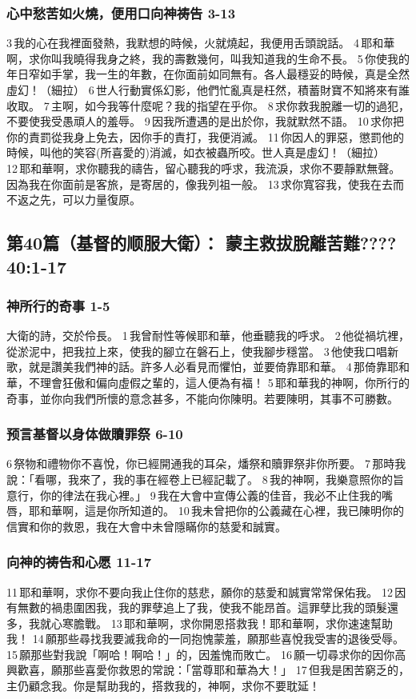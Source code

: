 \subsubsection{心中愁苦如火燒，便用口向神祷告 3-13}
3 我的心在我裡面發熱，我默想的時候，火就燒起，我便用舌頭說話。
4 耶和華啊，求你叫我曉得我身之終，我的壽數幾何，叫我知道我的生命不長。
5 你使我的年日窄如手掌，我一生的年數，在你面前如同無有。各人最穩妥的時候，真是全然虛幻！（細拉）
6 世人行動實係幻影，他們忙亂真是枉然，積蓄財寶不知將來有誰收取。
7 主啊，如今我等什麼呢？我的指望在乎你。
8 求你救我脫離一切的過犯，不要使我受愚頑人的羞辱。
9 因我所遭遇的是出於你，我就默然不語。
10 求你把你的責罰從我身上免去，因你手的責打，我便消滅。
11 你因人的罪惡，懲罰他的時候，叫他的笑容(所喜愛的)消滅，如衣被蟲所咬。世人真是虛幻！（細拉）
12 耶和華啊，求你聽我的禱告，留心聽我的呼求，我流淚，求你不要靜默無聲。因為我在你面前是客旅，是寄居的，像我列祖一般。
13 求你寬容我，使我在去而不返之先，可以力量復原。

\subsection{第40篇（基督的顺服大衛）： 蒙主救拔脫離苦難???? 40:1-17}
\subsubsection{神所行的奇事 1-5}
大衛的詩，交於伶長。
1 我曾耐性等候耶和華，他垂聽我的呼求。
2 他從禍坑裡，從淤泥中，把我拉上來，使我的腳立在磐石上，使我腳步穩當。
3 他使我口唱新歌，就是讚美我們神的話。許多人必看見而懼怕，並要倚靠耶和華。
4 那倚靠耶和華，不理會狂傲和偏向虛假之輩的，這人便為有福！
5 耶和華我的神啊，你所行的奇事，並你向我們所懷的意念甚多，不能向你陳明。若要陳明，其事不可勝數。
\subsubsection{预言基督以身体做贖罪祭 6-10}
6 祭物和禮物你不喜悅，你已經開通我的耳朵，燔祭和贖罪祭非你所要。
7 那時我說：「看哪，我來了，我的事在經卷上已經記載了。
8 我的神啊，我樂意照你的旨意行，你的律法在我心裡。」
9 我在大會中宣傳公義的佳音，我必不止住我的嘴唇，耶和華啊，這是你所知道的。
10 我未曾把你的公義藏在心裡，我已陳明你的信實和你的救恩，我在大會中未曾隱瞞你的慈愛和誠實。
\subsubsection{向神的祷告和心愿 11-17}
11 耶和華啊，求你不要向我止住你的慈悲，願你的慈愛和誠實常常保佑我。
12 因有無數的禍患圍困我，我的罪孽追上了我，使我不能昂首。這罪孽比我的頭髮還多，我就心寒膽戰。
13 耶和華啊，求你開恩搭救我！耶和華啊，求你速速幫助我！
14 願那些尋找我要滅我命的一同抱愧蒙羞，願那些喜悅我受害的退後受辱。
15 願那些對我說「啊哈！啊哈！」的，因羞愧而敗亡。
16 願一切尋求你的因你高興歡喜，願那些喜愛你救恩的常說：「當尊耶和華為大！」
17 但我是困苦窮乏的，主仍顧念我。你是幫助我的，搭救我的，神啊，求你不要耽延！

